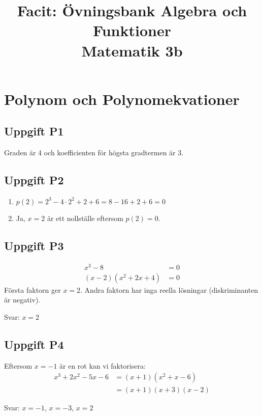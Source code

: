\documentclass[12pt]{article}
\title{Facit: Övningsbank Algebra och Funktioner \\ \large Matematik 3b}
\author{}
\date{}
\begin{document}
\maketitle

\section{Polynom och Polynomekvationer}

\subsection*{Uppgift P1}
Graden är 4 och koefficienten för högsta gradtermen är 3.

\subsection*{Uppgift P2}
\begin{enumerate}[label=\alph*)]
    \item $p(2) = 2^3 - 4 \cdot 2^2 + 2 + 6 = 8 - 16 + 2 + 6 = 0$
    \item Ja, $x = 2$ är ett nollställe eftersom $p(2) = 0$.
\end{enumerate}

\subsection*{Uppgift P3}
\begin{align*}
x^3 - 8 &= 0 \\
(x - 2)(x^2 + 2x + 4) &= 0
\end{align*}
Första faktorn ger $x = 2$. Andra faktorn har inga reella lösningar (diskriminanten är negativ).

Svar: $x = 2$

\subsection*{Uppgift P4}
Eftersom $x = -1$ är en rot kan vi faktorisera:
\begin{align*}
x^3 + 2x^2 - 5x - 6 &= (x + 1)(x^2 + x - 6) \\
&= (x + 1)(x + 3)(x - 2)
\end{align*}

Svar: $x = -1$, $x = -3$, $x = 2$
\end{document}
